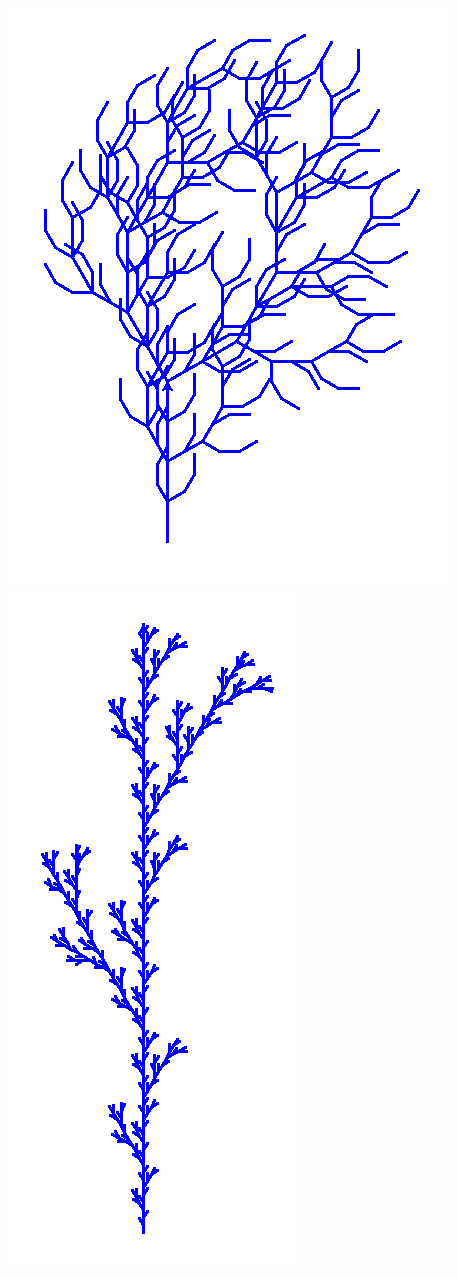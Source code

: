 \documentclass[11pt,class=report,crop=false]{standalone}
\begin{document}
\begin{activite}
\begin{enumerate}
\begin{center}
\includegraphics[scale=0.27]{ecran-lsysteme-15}\qquad
\includegraphics[scale=0.25]{ecran-lsysteme-16}\qquad

\end{center}
\end{enumerate}
\end{activite}
\end{document}
